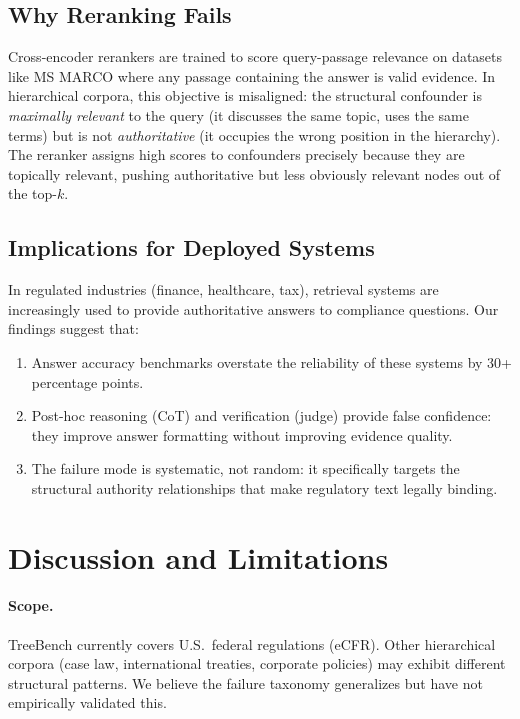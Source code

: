 \documentclass[11pt]{article}
\begin{document}
\subsection{Why Reranking Fails}

Cross-encoder rerankers are trained to score query-passage relevance on datasets like MS MARCO where any passage containing the answer is valid evidence. In hierarchical corpora, this objective is misaligned: the structural confounder is \emph{maximally relevant} to the query (it discusses the same topic, uses the same terms) but is not \emph{authoritative} (it occupies the wrong position in the hierarchy). The reranker assigns high scores to confounders precisely because they are topically relevant, pushing authoritative but less obviously relevant nodes out of the top-$k$.

\subsection{Implications for Deployed Systems}

In regulated industries (finance, healthcare, tax), retrieval systems are increasingly used to provide authoritative answers to compliance questions. Our findings suggest that:

\begin{enumerate}[nosep]
    \item Answer accuracy benchmarks overstate the reliability of these systems by 30+ percentage points.
    \item Post-hoc reasoning (CoT) and verification (judge) provide false confidence: they improve answer formatting without improving evidence quality.
    \item The failure mode is systematic, not random: it specifically targets the structural authority relationships that make regulatory text legally binding.
\end{enumerate}


\section{Discussion and Limitations}
\label{sec:discussion}

\paragraph{Scope.} TreeBench currently covers U.S.\ federal regulations (eCFR). Other hierarchical corpora (case law, international treaties, corporate policies) may exhibit different structural patterns. We believe the failure taxonomy generalizes but have not empirically validated this.
\end{document}
